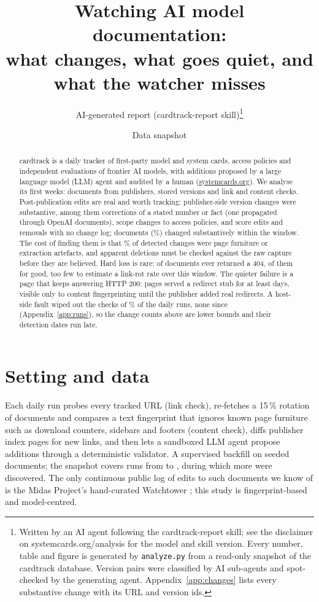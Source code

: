 \documentclass[10pt,a4paper]{article}
\title{\vspace{-14pt}\Large Watching AI model documentation:\\ what changes, what goes quiet, and what the watcher misses\vspace{-4pt}}
\author{\normalsize AI-generated report (cardtrack-report skill)\thanks{Written by an AI agent following the
cardtrack-report skill; see the disclaimer on systemcards.org/analysis for the model and skill version. Every number,
table and figure is generated by \texttt{analyze.py} from a read-only snapshot of the cardtrack database. Version
pairs were classified by AI sub-agents and spot-checked by the generating agent. Appendix~\ref{app:changes} lists
every substantive change with its URL and version ids.}}
\date{\normalsize Data snapshot \snapshotDatePretty}
\begin{document}
\maketitle
\vspace{-18pt}

\begin{abstract}
\noindent
cardtrack is a daily tracker of first-party model and system cards, access policies and independent
evaluations of frontier AI models, with additions proposed by a large language model (LLM) agent and
audited by a human (\href{https://systemcards.org}{systemcards.org}). We analyse its first \trackingWeeks{}
weeks: \nTracked{} documents from \nPublishers{} publishers, \nVersions{} stored versions and \nChecks{} link
and content checks. Post-publication edits are real and worth tracking: \nPubSubstantive{} publisher-side
version changes were substantive, among them \nFlagCorrection{} corrections of a stated number or fact (one propagated through
\notablePropagatedMax{} OpenAI documents), scope changes to access policies, and score edits and removals
with no change log; \nDocsSubstantive{} documents (\shareDocsSubstantive\%) changed substantively within the
window. The cost of finding them is that \sharePubNonchange\% of detected changes were page furniture or
extraction artefacts, and apparent deletions must be checked against the raw capture before they are
believed. Hard loss is rare: \docsEverNotFound{} of \nDocsWithValidChecks{} documents ever returned a 404,
\nDeadWord{} of them for good, too few to estimate a link-rot rate over this window. The quieter failure is
a page that keeps answering HTTP 200: \nSoftGoneWord{} pages served a redirect stub for at least
\softGoneDaysMin{} days, visible only to content fingerprinting until the publisher added real redirects. A
host-side fault wiped out the checks of \shareOutageRuns\% of the daily runs, none since \lastOutagePretty{}
(Appendix~\ref{app:runs}), so the change counts above are lower bounds
and their detection dates run late.
\end{abstract}

\section{Setting and data}
Each daily run probes every tracked URL (link check), re-fetches a 15\,\% rotation of documents and compares
a text fingerprint that ignores known page furniture such as download counters, sidebars and footers
(content check), diffs publisher index pages for new links, and then lets a sandboxed LLM agent propose
additions through a deterministic validator. A supervised backfill on \firstSeenMinPretty{} seeded
\nBackfill{} documents; the snapshot covers \nRuns{} runs from \firstRunPretty{} to \snapshotDatePretty,
during which \nPostBackfill{} more were discovered. The only continuous public log
of edits to such documents we know of is the Midas Project's hand-curated Watchtower \cite{midas2026}; this
study is fingerprint-based and model-centred.
\end{document}
